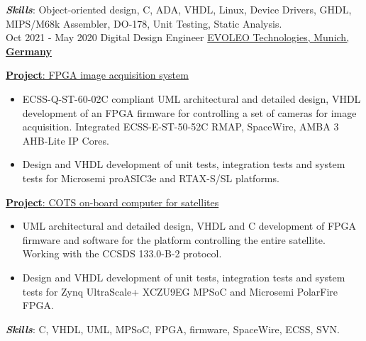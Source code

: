 \documentclass[letterpaper]{twentysecondcv} %
\begin{document}
\begin{twenty}
{            \vspace{2 mm}
            \textbf{\textit{Skills}}: Object-oriented design, C, ADA, VHDL, Linux, Device Drivers, GHDL, MIPS/M68k Assembler, DO-178, Unit Testing, Static Analysis.
        }\\
    \twentyitem
        {Oct 2021 -}
    	{May 2020}
        {Digital Design Engineer}
        {\href{http://evoleotech.com/company/}{EVOLEO Technologies, Munich, \textbf{Germany}}}
        {}
        {
            \vspace{2 mm}
            \underline{\textbf{Project}: FPGA image acquisition system}

            \vspace{2 mm}
            \begin{itemize}
                \item ECSS-Q-ST-60-02C compliant UML architectural and detailed design, VHDL development of an FPGA firmware for controlling a set of cameras for image acquisition. Integrated ECSS-E-ST-50-52C RMAP, SpaceWire, AMBA 3 AHB-Lite IP Cores.
                \item Design and VHDL development of unit tests, integration tests and system tests for Microsemi proASIC3e and RTAX-S/SL platforms.
            \end{itemize}

            \vspace{2 mm}
            \underline{\textbf{Project}: COTS on-board computer for satellites}

            \vspace{2 mm}
            \begin{itemize}
                \item UML architectural and detailed design, VHDL and C development of FPGA firmware and software for the platform controlling the entire satellite. Working with the CCSDS 133.0-B-2 protocol.
                \item Design and VHDL development of unit tests, integration tests and system tests for Zynq UltraScale+ XCZU9EG MPSoC and Microsemi PolarFire FPGA.
            \end{itemize}

            \vspace{2 mm}
            \textbf{\textit{Skills}}: C, VHDL, UML, MPSoC, FPGA, firmware, SpaceWire, ECSS, SVN.
        }
\end{twenty}

\newpage
\makeextrainfo %
\end{document}
